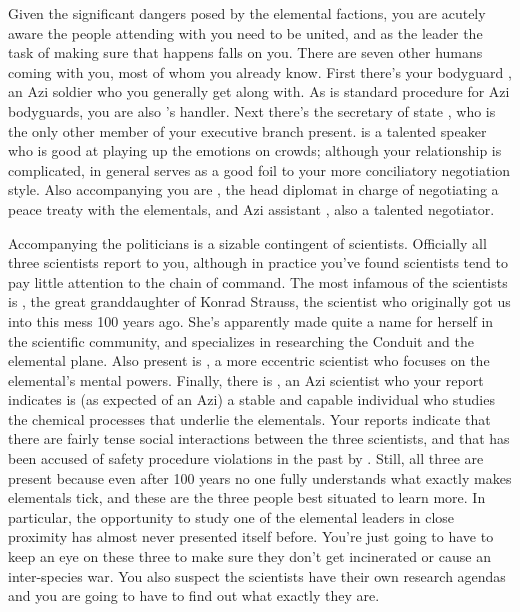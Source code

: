 \documentclass[char]{elementals}
\begin{document}
Given the significant dangers posed by the elemental factions, you are acutely aware the people attending with you need to be united, and as the leader the task of making sure that happens falls on you. There are seven other humans coming with you, most of whom you already know. First there's your bodyguard \cRomeo{\intro}, an Azi soldier who you generally get along with. As is standard procedure for Azi bodyguards, you are also \cRomeo{}'s handler. Next there's the secretary of state \cDema{\intro}, who is the only other member of your executive branch present. \cDema{\They} is a talented speaker who is good at playing up the emotions on crowds; although your relationship is complicated, in general \cDema{\they} serves as a good foil to your more conciliatory negotiation style. Also accompanying you are \cAvatar{\intro}, the head diplomat in charge of negotiating a peace treaty with the elementals, and \cAvatar{\their} Azi assistant \cDiplomat{\intro}, also a talented negotiator.

Accompanying the politicians is a sizable contingent of scientists. Officially all three scientists report to you, although in practice you've found scientists tend to pay little attention to the chain of command. The most infamous of the scientists is \cGD{\intro}, the great granddaughter of Konrad Strauss, the scientist who originally got us into this mess 100 years ago. She's apparently made quite a name for herself in the scientific community, and specializes in researching the Conduit and the elemental plane. Also present is \cMS{\intro}, a more eccentric scientist who focuses on the elemental's mental powers. Finally, there is \cScientist{\intro}, an Azi scientist who your report indicates is (as expected of an Azi) a stable and capable individual who studies the chemical processes that underlie the elementals. Your reports indicate that there are fairly tense social interactions between the three scientists, and that \cMS{} has been accused of safety procedure violations in the past by \cScientist{}. Still, all three are present because even after 100 years no one fully understands what exactly makes elementals tick, and these are the three people best situated to learn more. In particular, the opportunity to study one of the elemental leaders in close proximity has almost never presented itself before. You're just going to have to keep an eye on these three to make sure they don't get incinerated or cause an inter-species war. You also suspect the scientists have their own research agendas and you are going to have to find out what exactly they are.
\end{document}
